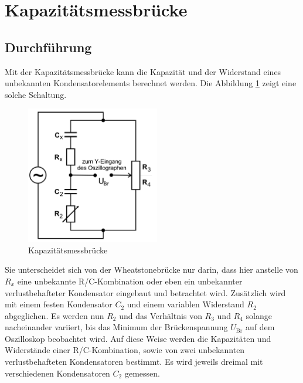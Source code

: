\section{Kapazitätsmessbrücke}
\subsection{Durchführung}
Mit der Kapazitätsmessbrücke kann die Kapazität und der Widerstand eines unbekannten Kondensatorelements berechnet werden.
Die Abbildung \ref{fig:2} zeigt eine solche Schaltung.
\begin{figure}[H]
  \centering
  \includegraphics[height=6cm]{kapa.png}
  \caption{Kapazitätsmessbrücke \cite{sample}}
  \label{fig:2}
\end{figure}
Sie unterscheidet sich von der Wheatstonebrücke nur darin, dass hier anstelle von $R_x$ eine unbekannte R/C-Kombination oder eben ein unbekannter verlustbehafteter Kondensator eingebaut und betrachtet wird.
Zusätzlich wird mit einem festen Kondensator $C_2$ und einem variablen Widerstand $R_2$ abgeglichen.
Es werden nun $R_2$ und das Verhältnis von $R_3$ und $R_4$ solange nacheinander variiert, bis das Minimum der Brückenspannung $U_{\text{Br}}$ auf dem Oszilloskop beobachtet wird.
Auf diese Weise werden die Kapazitäten und Widerstände einer R/C-Kombination, sowie von zwei unbekannten verlustbehafteten Kondensatoren bestimmt.
Es wird jeweils dreimal mit verschiedenen Kondensatoren $C_2$ gemessen.


